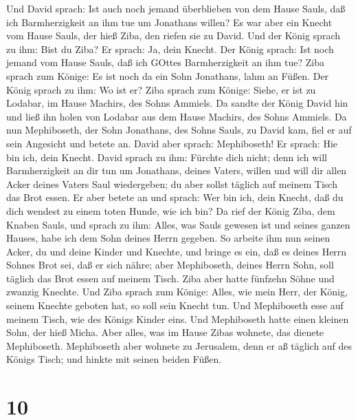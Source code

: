  Und David sprach: Ist auch noch jemand überblieben von dem
Hause Sauls, daß ich Barmherzigkeit an ihm tue um Jonathans willen?
 Es war aber ein Knecht vom Hause Sauls, der hieß Ziba, den
riefen sie zu David. Und der König sprach zu ihm: Bist du Ziba? Er
sprach: Ja, dein Knecht.  Der König sprach: Ist noch jemand
vom Hause Sauls, daß ich GOttes Barmherzigkeit an ihm tue? Ziba sprach
zum Könige: Es ist noch da ein Sohn Jonathans, lahm an Füßen.
 Der König sprach zu ihm: Wo ist er? Ziba sprach zum Könige:
Siehe, er ist zu Lodabar, im Hause Machirs, des Sohns Ammiels.
 Da sandte der König David hin und ließ ihn holen von
Lodabar aus dem Hause Machirs, des Sohns Ammiels.  Da nun
Mephiboseth, der Sohn Jonathans, des Sohns Sauls, zu David kam, fiel er
auf sein Angesicht und betete an. David aber sprach: Mephiboseth! Er
sprach: Hie bin ich, dein Knecht.  David sprach zu ihm:
Fürchte dich nicht; denn ich will Barmherzigkeit an dir tun um
Jonathans, deines Vaters, willen und will dir allen Acker deines Vaters
Saul wiedergeben; du aber sollst täglich auf meinem Tisch das Brot
essen.  Er aber betete an und sprach: Wer bin ich, dein
Knecht, daß du dich wendest zu einem toten Hunde, wie ich bin?
 Da rief der König Ziba, dem Knaben Sauls, und sprach zu
ihm: Alles, was Sauls gewesen ist und seines ganzen Hauses, habe ich dem
Sohn deines Herrn gegeben.  So arbeite ihm nun seinen
Acker, du und deine Kinder und Knechte, und bringe es ein, daß es deines
Herrn Sohnes Brot sei, daß er sich nähre; aber Mephiboseth, deines Herrn
Sohn, soll täglich das Brot essen auf meinem Tisch. Ziba aber hatte
fünfzehn Söhne und zwanzig Knechte.  Und Ziba sprach zum
Könige: Alles, wie mein Herr, der König, seinem Knechte geboten hat, so
soll sein Knecht tun. Und Mephiboseth esse auf meinem Tisch, wie des
Königs Kinder eins.  Und Mephiboseth hatte einen kleinen
Sohn, der hieß Micha. Aber alles, was im Hause Zibas wohnete, das
dienete Mephiboseth.  Mephiboseth aber wohnete zu
Jerusalem, denn er aß täglich auf des Königs Tisch; und hinkte mit
seinen beiden Füßen.

\hypertarget{section-9}{%
\section{10}\label{section-9}}


